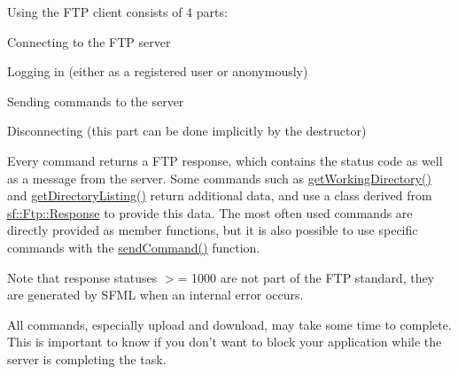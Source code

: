 Using the F\-T\-P client consists of 4 parts\-: \begin{DoxyItemize}
\item Connecting to the F\-T\-P server \item Logging in (either as a registered user or anonymously) \item Sending commands to the server \item Disconnecting (this part can be done implicitly by the destructor)\end{DoxyItemize}
Every command returns a F\-T\-P response, which contains the status code as well as a message from the server. Some commands such as \hyperlink{classsf_1_1_ftp_a79c654fcdd0c81e68c4fa29af3b45e0c}{get\-Working\-Directory()} and \hyperlink{classsf_1_1_ftp_a8f37258e461fcb9e2a0655e9df0be4a0}{get\-Directory\-Listing()} return additional data, and use a class derived from \hyperlink{classsf_1_1_ftp_1_1_response}{sf\-::\-Ftp\-::\-Response} to provide this data. The most often used commands are directly provided as member functions, but it is also possible to use specific commands with the \hyperlink{classsf_1_1_ftp_a44e095103ecbce175a33eaf0820440ff}{send\-Command()} function.

Note that response statuses $>$= 1000 are not part of the F\-T\-P standard, they are generated by S\-F\-M\-L when an internal error occurs.

All commands, especially upload and download, may take some time to complete. This is important to know if you don't want to block your application while the server is completing the task.

